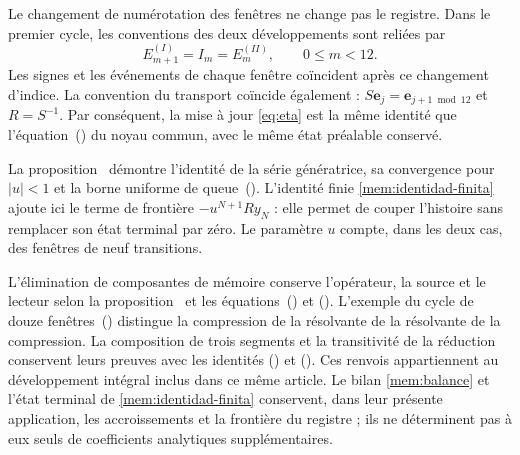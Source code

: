 Le changement de numérotation des fenêtres ne change pas le registre. Dans le
premier cycle, les conventions des deux développements sont reliées par
\[
 E^{(I)}_{m+1}=I_m=E^{(II)}_m,\qquad 0\leq m<12.
\]
Les signes et les événements de chaque fenêtre coïncident après ce
changement d’indice. La convention du transport coïncide également :
\(S\mathbf e_j=\mathbf e_{j+1\bmod12}\) et \(R=S^{-1}\).
Par conséquent, la mise à jour \eqref{eq:eta} est la même identité que
l’équation~\textup{()} du noyau
commun, avec le même état préalable conservé.

La proposition~ démontre l’identité
de la série génératrice, sa convergence pour \(|u|<1\) et la borne uniforme
de queue~\textup{()}. L’identité finie
\eqref{mem:identidad-finita} ajoute ici le terme de frontière
\(-u^{N+1}Ry_N\) : elle permet de couper l’histoire sans remplacer son état
terminal par zéro. Le paramètre \(u\) compte, dans les deux cas, des fenêtres
de neuf transitions.

L’élimination de composantes de mémoire conserve l’opérateur, la source
et le lecteur selon la proposition~ et
les équations~\textup{()} et
\textup{()}. L’exemple du cycle
de douze fenêtres~\textup{()}
distingue la compression de la résolvante de la résolvante de la compression.
La composition de trois segments et la transitivité de la réduction
conservent leurs preuves avec les identités
\textup{()} et
\textup{()}.
Ces renvois appartiennent au développement intégral inclus dans ce même
article. Le bilan \eqref{mem:balance} et l’état terminal de
\eqref{mem:identidad-finita} conservent, dans leur présente application,
les accroissements et la frontière du registre ; ils ne déterminent pas à eux seuls
de coefficients analytiques supplémentaires.

